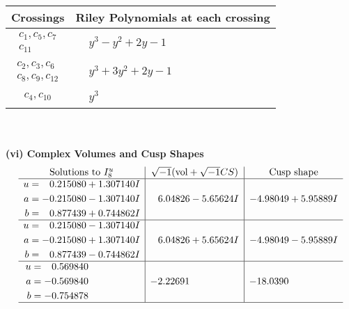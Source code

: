 \documentclass[1p]{elsarticle_modified}
\theoremstyle{definition}
\newcommand{\I}{\sqrt{-1}}
\begin{document}
\begin{tabular}{m{50pt}|m{274pt}}
Crossings & \hspace{64pt}Riley Polynomials at each crossing \\
\hline $$\begin{aligned}c_{1},c_{5},c_{7}\\c_{11}\end{aligned}$$&$\begin{aligned}
&y^3- y^2+2 y-1
\end{aligned}$\\
\hline $$\begin{aligned}c_{2},c_{3},c_{6}\\c_{8},c_{9},c_{12}\end{aligned}$$&$\begin{aligned}
&y^3+3 y^2+2 y-1
\end{aligned}$\\
\hline $$\begin{aligned}c_{4},c_{10}\end{aligned}$$&$\begin{aligned}
&y^3
\end{aligned}$\\
\hline
\end{tabular}\\~\\
\newpage\flushleft \textbf{(vi) Complex Volumes and Cusp Shapes}
$$\begin{array}{c|c|c}  
\text{Solutions to }I^u_{8}& \I (\text{vol} + \sqrt{-1}CS) & \text{Cusp shape}\\
 \hline 
\begin{aligned}
u &= \phantom{-}0.215080 + 1.307140 I \\
a &= -0.215080 - 1.307140 I \\
b &= \phantom{-}0.877439 + 0.744862 I\end{aligned}
 & \phantom{-}6.04826 - 5.65624 I & -4.98049 + 5.95889 I \\ \hline\begin{aligned}
u &= \phantom{-}0.215080 - 1.307140 I \\
a &= -0.215080 + 1.307140 I \\
b &= \phantom{-}0.877439 - 0.744862 I\end{aligned}
 & \phantom{-}6.04826 + 5.65624 I & -4.98049 - 5.95889 I \\ \hline\begin{aligned}
u &= \phantom{-}0.569840\phantom{ +0.000000I} \\
a &= -0.569840\phantom{ +0.000000I} \\
b &= -0.754878\phantom{ +0.000000I}\end{aligned}
 & -2.22691\phantom{ +0.000000I} & -18.0390\phantom{ +0.000000I}\\
 \hline 
 \end{array}$$\newpage\newpage\renewcommand{\arraystretch}{1}
\end{document}
